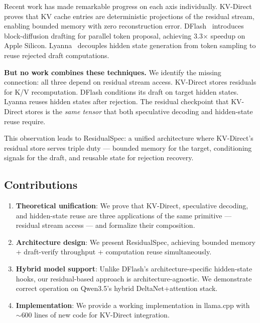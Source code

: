 \documentclass[11pt]{article}
\begin{document}
Recent work has made remarkable progress on each axis individually. KV-Direct~\cite{qasim2026kvdirect} proves that KV cache entries are deterministic projections of the residual stream, enabling bounded memory with zero reconstruction error. DFlash~\cite{chen2026dflash} introduces block-diffusion drafting for parallel token proposal, achieving 3.3$\times$ speedup on Apple Silicon. Lyanna~\cite{chen2026lyanna} decouples hidden state generation from token sampling to reuse rejected draft computations.

\textbf{But no work combines these techniques.} We identify the missing connection: all three depend on residual stream access. KV-Direct stores residuals for K/V recomputation. DFlash conditions its draft on target hidden states. Lyanna reuses hidden states after rejection. The residual checkpoint that KV-Direct stores is the \textit{same tensor} that both speculative decoding and hidden-state reuse require.

This observation leads to ResidualSpec: a unified architecture where KV-Direct's residual store serves triple duty — bounded memory for the target, conditioning signals for the draft, and reusable state for rejection recovery.

\subsection{Contributions}
\begin{enumerate}[label=(\arabic*)]
    \item \textbf{Theoretical unification}: We prove that KV-Direct, speculative decoding, and hidden-state reuse are three applications of the same primitive — residual stream access — and formalize their composition.
    
    \item \textbf{Architecture design}: We present ResidualSpec, achieving bounded memory + draft-verify throughput + computation reuse simultaneously.
    
    \item \textbf{Hybrid model support}: Unlike DFlash's architecture-specific hidden-state hooks, our residual-based approach is architecture-agnostic. We demonstrate correct operation on Qwen3.5's hybrid DeltaNet+attention stack.
    
    \item \textbf{Implementation}: We provide a working implementation in llama.cpp with $\sim$600 lines of new code for KV-Direct integration.
\end{enumerate}
\end{document}
